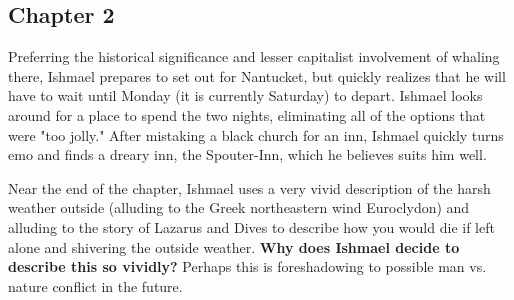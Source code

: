 \subsection{Chapter 2}

Preferring the historical significance and lesser capitalist involvement of
whaling there, Ishmael prepares to set out for Nantucket, but quickly realizes
that he will have to wait until Monday (it is currently Saturday) to depart.
Ishmael looks around for a place to spend the two nights, eliminating all of
the options that were "too jolly." After mistaking a black church for an inn,
Ishmael quickly turns emo and finds a dreary inn, the Spouter-Inn, which he
believes suits him well.

Near the end of the chapter, Ishmael uses a very vivid description of the
harsh weather outside (alluding to the Greek northeastern wind Euroclydon) and
alluding to the story of Lazarus and Dives to describe how you would die if
left alone and shivering the outside weather. \textbf{Why does Ishmael decide
to describe this so vividly?} Perhaps this is foreshadowing to possible man vs.
nature conflict in the future.
